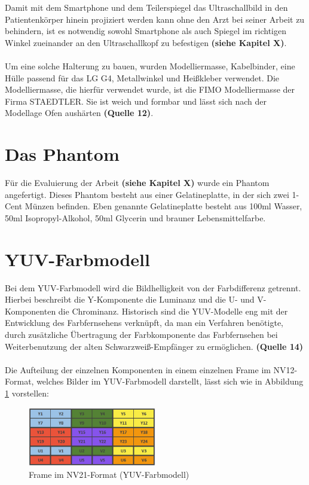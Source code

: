 Damit mit dem Smartphone und dem Teilerspiegel das Ultraschallbild in den Patientenkörper hinein projiziert werden kann ohne den Arzt bei seiner Arbeit zu behindern, ist es notwendig sowohl Smartphone als auch Spiegel im richtigen Winkel zueinander an den Ultraschallkopf zu befestigen \textbf{(siehe Kapitel X)}.
\\
\\
Um eine solche Halterung zu bauen, wurden Modelliermasse, Kabelbinder, eine Hülle passend für das LG G4, Metallwinkel und Heißkleber verwendet. Die Modelliermasse, die hierfür verwendet wurde, ist die FIMO Modelliermasse der Firma STAEDTLER. Sie ist weich und formbar und lässt sich nach der Modellage Ofen aushärten \textbf{(Quelle 12)}.

\section{Das Phantom}

Für die Evaluierung der Arbeit \textbf{(siehe Kapitel X)} wurde ein Phantom angefertigt. Dieses Phantom besteht aus einer Gelatineplatte, in der sich zwei 1-Cent Münzen befinden. Eben genannte Gelatineplatte besteht aus 100ml Wasser, 50ml Isopropyl-Alkohol, 50ml Glycerin und brauner Lebensmittelfarbe.

\section{YUV-Farbmodell} \label{YUV}

Bei dem YUV-Farbmodell wird die Bildhelligkeit von der Farbdifferenz getrennt. Hierbei beschreibt die Y-Komponente die Luminanz und die U- und V-Komponenten die Chrominanz. Historisch sind die YUV-Modelle eng mit der Entwicklung des Farbfernsehens verknüpft, da man ein Verfahren benötigte, durch zusätzliche Übertragung der Farbkomponente das Farbfernsehen bei Weiterbenutzung der alten Schwarzweiß-Empfänger zu ermöglichen. \textbf{(Quelle 14)}
\\
\\
Die Aufteilung der einzelnen Komponenten in einem einzelnen Frame im NV12-Format, welches Bilder im YUV-Farbmodell darstellt, lässt sich wie in Abbildung \ref{fig:YUV_Frame} vorstellen:


\begin{figure}[h]
	\centering
	\includegraphics[width=0.5\textwidth]{Bilder/Materialien_und_Grundlagen/YUV_Frame.PNG}
	\caption{Frame im NV21-Format (YUV-Farbmodell)}
	\label{fig:YUV_Frame}
\end{figure}

